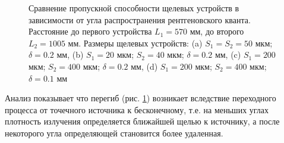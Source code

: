 \begin{figure}[H]
 \centering
 \hfill
 \hfill
 \hfill
 \caption{Сравнение пропускной способности щелевых устройств в зависимости от угла распространения
 рентгеновского кванта. Расстояние до первого устройства $L_1 = 570$ мм, до второго $L_2 = 1005 $ мм.
 Размеры щелевых устройств: (a) $S_1 = S_2 = 50$ мкм; $\delta = 0.2$ мм, (b) $S_1 = 20$ мкм; $S_2 = 40$ мкм; $\delta = 0.2$ мм,
  (c) $S_1 = 200$ мкм; $S_2 = 400$ мкм; $\delta = 0.2$ мм,  (d) $S_1 = 200$ мкм; $S_2 = 400$ мкм; $\delta = 0.1$ мм}
 \label{ris:calc_slits_ability_res}
\end{figure}

Анализ показывает что перегиб (рис. \ref{ris:calc_slits_ability_res}) возникает вследствие переходного
процесса от точечного источника к бесконечному, т.е. на меньших углах плотность излучения определяется ближайшей
щелью к источнику, а после некоторого угла определяющей становится более удаленная.
